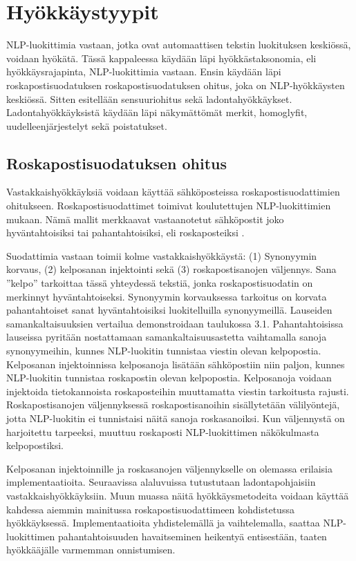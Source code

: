 \chapter{Hyökkäystyypit\label{results}}

NLP-luokittimia vastaan, jotka ovat automaattisen tekstin luokituksen keskiössä, voidaan hyökätä. Tässä kappaleessa käydään läpi hyökkästaksonomia, eli hyökkäysrajapinta, NLP-luokittimia vastaan. Ensin käydään läpi roskapostisuodatuksen roskapostisuodatuksen ohitus, joka on NLP-hyökkäysten keskiössä. Sitten esitellään sensuuriohitus sekä ladontahyökkäykset. Ladontahyökkäyksistä käydään läpi näkymättömät merkit, homoglyfit, uudelleenjärjestelyt sekä poistatukset.

\section{Roskapostisuodatuksen ohitus}
Vastakkaishyökkäyksiä voidaan käyttää sähköposteissa roskapostisuodattimien ohitukseen. Roskapostisuodattimet toimivat koulutettujen NLP-luokittimien mukaan. Nämä mallit merkkaavat vastaanotetut sähköpostit joko hyväntahtoisiksi tai pahantahtoisiksi, eli roskaposteiksi \citep{spamfilter}.

Suodattimia vastaan toimii kolme vastakkaishyökkäystä: (1) Synonyymin korvaus, (2) kelposanan injektointi sekä (3) roskapostisanojen väljennys. Sana ''kelpo'' tarkoittaa tässä yhteydessä tekstiä, jonka roskapostisuodatin on merkinnyt hyväntahtoiseksi. Synonyymin korvauksessa tarkoitus on korvata pahantahtoiset sanat hyväntahtoisiksi luokitelluilla synonyymeillä. Lauseiden samankaltaisuuksien vertailua demonstroidaan taulukossa 3.1. Pahantahtoisissa lauseissa pyritään nostattamaan samankaltaisuusastetta vaihtamalla sanoja synonyymeihin, kunnes NLP-luokitin tunnistaa viestin olevan kelpopostia. Kelposanan injektoinnissa kelposanoja lisätään sähköpostiin niin paljon, kunnes NLP-luokitin tunnistaa roskapostin olevan kelpopostia. Kelposanoja voidaan injektoida tietokannoista roskaposteihin muuttamatta viestin tarkoitusta rajusti. Roskapostisanojen väljennyksessä roskapostisanoihin sisällytetään välilyöntejä, jotta NLP-luokitin ei tunnistaisi näitä sanoja roskasanoiksi. Kun väljennystä on harjoitettu tarpeeksi, muuttuu roskaposti NLP-luokittimen näkökulmasta kelpopostiksi. \citep{spamfilter}

Kelposanan injektoinnille ja roskasanojen väljennykselle on olemassa erilaisia implementaatioita. Seuraavissa alaluvuissa tutustutaan ladontapohjaisiin vastakkaishyökkäyksiin. Muun muassa näitä hyökkäysmetodeita voidaan käyttää kahdessa aiemmin mainitussa roskapostisuodattimeen kohdistetussa hyökkäyksessä. Implementaatioita yhdistelemällä ja vaihtelemalla, saattaa NLP-luokittimen pahantahtoisuuden havaitseminen heikentyä entisestään, taaten hyökkääjälle varmemman onnistumisen.

